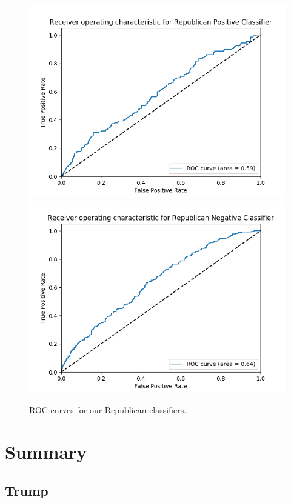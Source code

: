 \documentclass[12pt]{article}
\begin{document}
\begin{figure}[H]
                  \includegraphics[width=\linewidth]{RepublicanPositiveClassifier.png}
        \endminipage\hfill
                  \includegraphics[width=\linewidth]{RepublicanNegativeClassifier.png}
        \endminipage
        \caption{ROC curves for our Republican classifiers.}
\end{figure}

\section{Summary}

\subsection{Trump}
\end{document}
